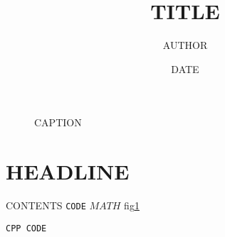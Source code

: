 \documentclass[11pt]{article}
\title{TITLE}
\author{AUTHOR}
\date{DATE}
\begin{document}
\maketitle

\begin{figure}[h] %
    \centering
    \caption{CAPTION}
    \label{fig:LABEL}
\end{figure}

\section{HEADLINE}
CONTENTS \texttt{CODE} $MATH$ fig\ref{fig:LABEL}

\begin{lstlisting}[frame=single,caption={CAPTION}]
CPP CODE
\end{lstlisting}
\end{document}
